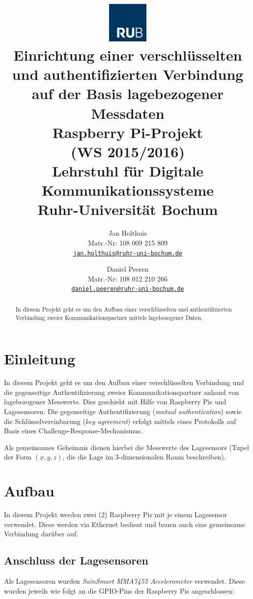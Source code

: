 \documentclass{article}
\title{
\includegraphics[height=2cm]{images/logo_rub}\\\vspace{1cm}
Einrichtung einer verschlüsselten und authentifizierten Verbindung auf der Basis lagebezogener Messdaten\\\vspace{7mm}
Raspberry Pi-Projekt\\(WS 2015/2016)\\\vspace{1cm}
\large{Lehrstuhl für Digitale Kommunikationssysteme\\
Ruhr-Universität Bochum
\\\vspace{0.75cm}}}
\author{
Jan Holthuis\\
Matr.-Nr: 108 009 215 809\\
{\tt \href{mailto:jan.holthuis@ruhr-uni-bochum.de}{jan.holthuis@ruhr-uni-bochum.de}}
\and 
Daniel Peeren\\
Matr.-Nr: 108 012 210 266\\
{\tt \href{mailto:daniel.peeren@ruhr-uni-bochum.de}{daniel.peeren@ruhr-uni-bochum.de}}
\vspace{0.75cm}}
\begin{document}
\maketitle
\thispagestyle{empty}

\begin{abstract}
\noindent
In diesem Projekt geht es um den Aufbau einer verschlüsselten und authentifizierten Verbindung zweier Kommunikationspartner mittels lagebezogener Daten.
\end{abstract}

\newpage
\thispagestyle{empty}
\tableofcontents

\newpage
\setlength{\parindent}{0pt}
\setcounter{page}{1}
\section{Einleitung}
In diesem Projekt geht es um den Aufbau einer verschlüsselten Verbindung und die gegenseitige Authentifizierung zweier Kommunikationspartner anhand von lagebezogener Messwerte. Dies geschieht mit Hilfe von Raspberry Pis und Lagesensoren. Die gegenseitige Authentifizierung (\emph{mutual authentication}) sowie die Schlüsselvereinbarung (\emph{key agreement}) erfolgt mittels eines Protokolls auf Basis eines Challenge-Response-Mechanismus.

Als gemeinsames Geheimnis dienen hierbei die Messwerte des Lagesensors (Tupel der Form $(x, y, z)$, die die Lage im 3-dimensionalen Raum beschreiben).

\newpage
\section{Aufbau}
In diesem Projekt werden zwei (2) Raspberry Pis mit je einem Lagesensor verwendet. Diese werden via Ethernet bedient und bauen auch eine gemeinsame Verbindung darüber auf.\\

\subsection{Anschluss der Lagesensoren}

Als Lagesensoren wurden \emph{SainSmart MMA7455 Accelerometer} verwendet. Diese wurden jeweils wie folgt an die GPIO-Pins der Raspberry Pis angeschlossen:

\vspace{1cm}
\end{document}
